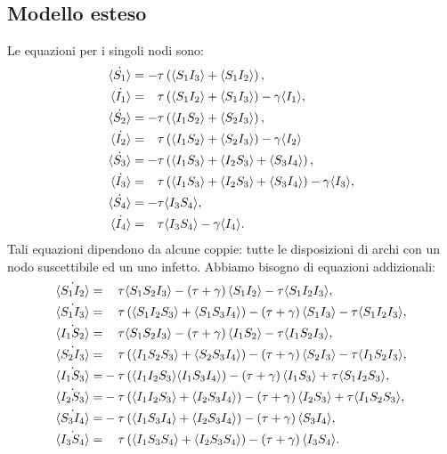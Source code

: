 \subsection{Modello esteso}\label{lollipop_completo}
Le equazioni per i singoli nodi sono:
 \begin{equation*}
 \begin{aligned}
 	\dot{\angol{S_1}}&= -\tau \tonde{ \angol{ S_1 I_3} + \angol{S_1 I_2}}, 
 \\ 
 	\dot{\angol{I_1}}&= \spa \tau \tonde{ \angol{ S_1 I_2} + \angol{S_1 I_3}} - \gamma\angol{I_1},
 \\
  	\dot{\angol{S_2}}&= -\tau \tonde{ \angol{ I_1 S_2} + \angol{S_2 I_3}}, 
 \\
 \dot{\angol{I_2}}&= \spa \tau \tonde{ \angol{ I_1 S_2} + \angol{S_2 I_3}} - \gamma\angol{I_2}
 \\
  \dot{\angol{S_3}}&= -\tau \tonde{ \angol{I_1 S_3} + \angol{I_2 S_3}+ \angol{S_3 I_4}},  \\
 \dot{\angol{I_3}}&= \spa \tau \tonde{ \angol{I_1 S_3} + \angol{I_2 S_3}+ \angol{S_3 I_4}}-\gamma\angol{I_3},\\
\dot{\angol{S_4}} &= -\tau \angol{I_3S_4},\\
  \dot{\angol{I_4}}&=\spa \tau\angol{I_3S_4}-\gamma\angol{I_4}.
 \end{aligned}	
 \end{equation*}
 Tali equazioni dipendono da alcune coppie: tutte le disposizioni di archi con un nodo suscettibile ed un uno infetto. Abbiamo bisogno di equazioni addizionali:
 \begin{equation*}
 \begin{aligned}
 \dot{\angol{S_1I_2}} =&\spa \tau\angol{S_1S_2I_3} - \tonde{ \tau + \gamma} \angol{S_1 I_2} -\tau\angol{S_1I_2I_3},\\
 \dot{\angol{S_1I_3}}=&\spa \tau\tonde{ \angol{S_1I_2S_3} + \angol{S_1S_3I_4}} - \tonde{ \tau +\gamma}\angol{S_1 I_3} -\tau \angol{ S_1 I_2 I_3},\\
 \dot{\angol{I_1S_2}} =&\spa\tau\angol{S_1S_2I_3} - \tonde{ \tau + \gamma} \angol{I_1 S_2} -\tau\angol{I_1S_2I_3},\\
\dot{\angol{S_2I_3}} =&\spa \tau\tonde{\angol{I_1S_2S_3} +{\angol{S_2S_3I_4}}} - \tonde{ \tau + \gamma} \angol{S_2 I_3} -\tau\angol{I_1S_2I_3},\\
 \dot{\angol{I_1S_3}} =&- \tau\tonde{\angol{I_1I_2S_3} \angol{I_1S_3I_4}} - \tonde{ \tau + \gamma} \angol{I_1 S_3} +\tau\angol{S_1I_2S_3},\\ 
\dot{\angol{I_2S_3}} =&- \tau\tonde{\angol{I_1I_2S_3} +\angol{I_2S_3I_4}} - \tonde{ \tau + \gamma} \angol{I_2 S_3} +\tau\angol{I_1S_2S_3},\\ 
 \dot{\angol{S_3I_4}} =&- \tau\tonde{\angol{I_1S_3I_4}+\angol{I_2S_3I_4}} - \tonde{ \tau + \gamma} \angol{S_3 I_4}, \\ 
    \dot{\angol{I_3S_4}} =& \spa \tau\tonde{\angol{I_1S_3S_4}+\angol{I_2S_3S_4}} - \tonde{ \tau + \gamma} \angol{I_3 S_4}.\\ 
\end{aligned}
 \end{equation*}
